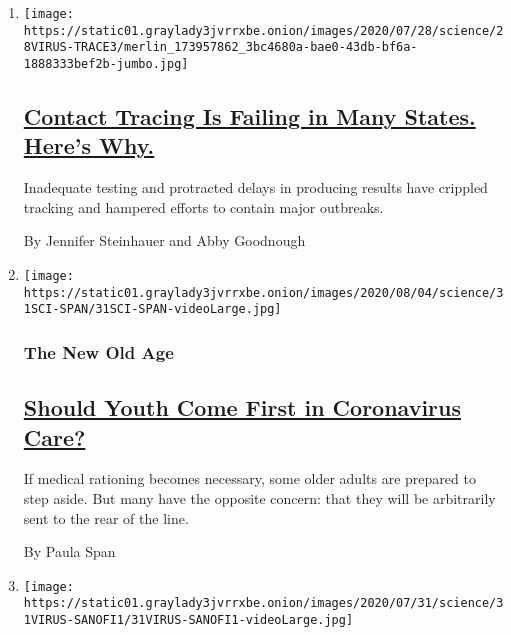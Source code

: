 \begin{enumerate}
\def\labelenumi{\arabic{enumi}.}
\item
  \texttt{[image: https://static01.graylady3jvrrxbe.onion/images/2020/07/28/science/28VIRUS-TRACE3/merlin\_173957862\_3bc4680a-bae0-43db-bf6a-1888333bef2b-jumbo.jpg]}

  \hypertarget{contact-tracing-is-failing-in-many-states-heres-why}{%
  \subsection{\texorpdfstring{\href{/2020/07/31/health/covid-contact-tracing-tests.html}{Contact
  Tracing Is Failing in Many States. Here's
  Why.}}{Contact Tracing Is Failing in Many States. Here's Why.}}\label{contact-tracing-is-failing-in-many-states-heres-why}}

  Inadequate testing and protracted delays in producing results have
  crippled tracking and hampered efforts to contain major outbreaks.

  By Jennifer Steinhauer and Abby Goodnough
\item
  \texttt{[image: https://static01.graylady3jvrrxbe.onion/images/2020/08/04/science/31SCI-SPAN/31SCI-SPAN-videoLarge.jpg]}

  \hypertarget{the-new-old-age}{%
  \subsubsection{The New Old Age}\label{the-new-old-age}}

  \hypertarget{should-youth-come-first-in-coronavirus-care}{%
  \subsection{\texorpdfstring{\href{/2020/07/31/health/coronavirus-ethics-rationing-elderly.html}{Should
  Youth Come First in Coronavirus
  Care?}}{Should Youth Come First in Coronavirus Care?}}\label{should-youth-come-first-in-coronavirus-care}}

  If medical rationing becomes necessary, some older adults are prepared
  to step aside. But many have the opposite concern: that they will be
  arbitrarily sent to the rear of the line.

  By Paula Span
\item
  \texttt{[image: https://static01.graylady3jvrrxbe.onion/images/2020/07/31/science/31VIRUS-SANOFI1/31VIRUS-SANOFI1-videoLarge.jpg]}

  \hypertarget{sanofi-and-glaxosmithkline-snag-biggest-coronavirus-vaccine-deal-yet}{%
}
\end{enumerate}
